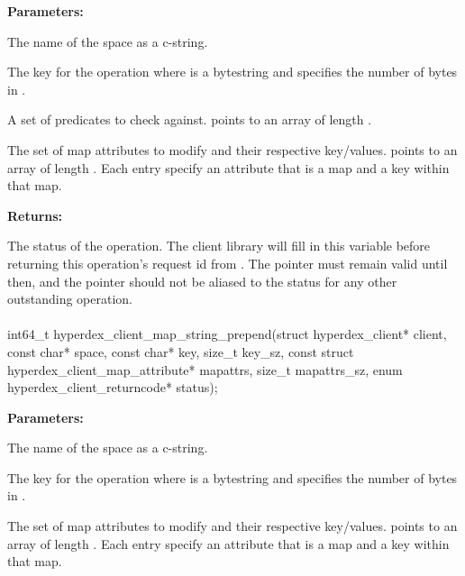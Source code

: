 \noindent\textbf{Parameters:}
\begin{description}[labelindent=\widthof{{\code{mapattrs}, \code{mapattrs\_sz}}},leftmargin=*,noitemsep,nolistsep,align=right]
\item[\code{space}] The name of the space as a c-string.
\item[\code{key}, \code{key\_sz}] The key for the operation where  is a bytestring and  specifies the number of bytes in .
\item[\code{checks}, \code{checks\_sz}] A set of predicates to check against.   points to an array of length .
\item[\code{mapattrs}, \code{mapattrs\_sz}] The set of map attributes to modify and their respective key/values.   points to an array of length .  Each entry specify an attribute that is a map and a key within that map.
\end{description}

\noindent\textbf{Returns:}
\begin{description}[labelindent=\widthof{{\code{status}}},leftmargin=*,noitemsep,nolistsep,align=right]
\item[\code{status}] The status of the operation.  The client library will fill in this variable before returning this operation's request id from .  The pointer must remain valid until then, and the pointer should not be aliased to the status for any other outstanding operation.
\end{description}

\paragraph{}
\label{api:c:map_string_prepend}
\begin{ccode}
int64_t hyperdex_client_map_string_prepend(struct hyperdex_client* client,
                const char* space,
                const char* key, size_t key_sz,
                const struct hyperdex_client_map_attribute* mapattrs, size_t mapattrs_sz,
                enum hyperdex_client_returncode* status);
\end{ccode}
\funcdesc 

\noindent\textbf{Parameters:}
\begin{description}[labelindent=\widthof{{\code{mapattrs}, \code{mapattrs\_sz}}},leftmargin=*,noitemsep,nolistsep,align=right]
\item[\code{space}] The name of the space as a c-string.
\item[\code{key}, \code{key\_sz}] The key for the operation where  is a bytestring and  specifies the number of bytes in .
\item[\code{mapattrs}, \code{mapattrs\_sz}] The set of map attributes to modify and their respective key/values.   points to an array of length .  Each entry specify an attribute that is a map and a key within that map.
\end{description}

